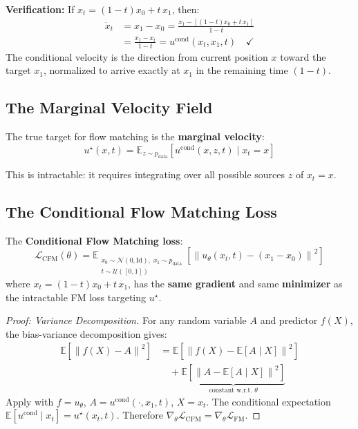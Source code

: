 \documentclass[11pt, a4paper]{article}
\newcommand{\E}{\mathbb{E}}
\newcommand{\Id}{\mathrm{Id}}
\newcommand{\pdata}{p_{\mathrm{data}}}
\newcommand{\grad}{\nabla}
\newcommand{\norm}[1]{\left\|#1\right\|}
\theoremstyle{plain}
\theoremstyle{definition}
\theoremstyle{remark}
\begin{document}
\begin{intubox}
\textbf{Verification:} If $x_t = (1-t)x_0 + t\,x_1$, then:
\[
\begin{aligned}
  \dot{x}_t &= x_1 - x_0 = \frac{x_1 - [(1-t)x_0 + t\,x_1]}{1-t} \\
            &= \frac{x_1 - x_t}{1-t} = u^{\mathrm{cond}}(x_t, x_1, t) \quad \checkmark
\end{aligned}
\]
The conditional velocity is the direction from current position $x$ toward the target $x_1$, normalized to arrive exactly at $x_1$ in the remaining time $(1-t)$.
\end{intubox}

\subsection{The Marginal Velocity Field}

The true target for flow matching is the \textbf{marginal velocity}:
\begin{equation}
  u^\star(x, t) = \E_{z \sim \pdata}\!\left[u^{\mathrm{cond}}(x, z, t) \;\big|\; x_t = x\right]
  \label{eq:marginal_vel}
\end{equation}

This is intractable: it requires integrating over all possible sources $z$ of $x_t = x$.

\subsection{The Conditional Flow Matching Loss}

\begin{thmbox}
The \textbf{Conditional Flow Matching loss}:
\begin{equation}
  \mathcal{L}_{\mathrm{CFM}}(\theta) = \E_{\substack{x_0 \sim \mathcal{N}(0,\Id),\; x_1 \sim \pdata \\ t \sim \mathcal{U}([0,1])}}\!\left[
  \norm{u_\theta(x_t, t) - (x_1 - x_0)}^2
  \right]
  \label{eq:cfm_loss}
\end{equation}
where $x_t = (1-t)x_0 + t\,x_1$, has the \textbf{same gradient} and same \textbf{minimizer} as the intractable FM loss targeting $u^\star$.
\end{thmbox}

\begin{proof}[Proof: Variance Decomposition]
For any random variable $A$ and predictor $f(X)$, the bias-variance decomposition gives:
\[
\begin{aligned}
  \E\!\left[\norm{f(X) - A}^2\right] &= \E\!\left[\norm{f(X) - \E[A \mid X]}^2\right] \\
  &\quad + \underbrace{\E\!\left[\norm{A - \E[A \mid X]}^2\right]}_{\text{constant w.r.t.\ } \theta}
\end{aligned}
\]
Apply with $f = u_\theta$, $A = u^{\mathrm{cond}}(\cdot, x_1, t)$, $X = x_t$. The conditional expectation $\E[u^{\mathrm{cond}} \mid x_t] = u^\star(x_t, t)$. Therefore $\grad_\theta \mathcal{L}_{\mathrm{CFM}} = \grad_\theta \mathcal{L}_{\mathrm{FM}}$.
\end{proof}
\end{document}

